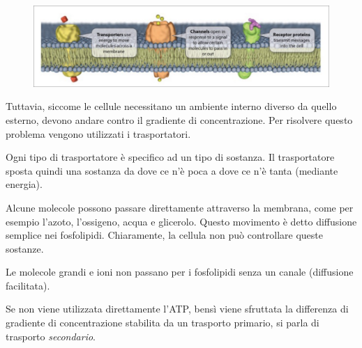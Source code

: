 \documentclass[a4paper]{article}
\begin{document}
\begin{figure}[h!]
    \centering
    \includegraphics[width=\textwidth]{./proteine_mem.png}
\end{figure}

Tuttavia, siccome le cellule necessitano un ambiente interno diverso da quello esterno,
devono andare contro il gradiente di concentrazione.
Per risolvere questo problema vengono utilizzati i trasportatori.

Ogni tipo di trasportatore è specifico ad un tipo di sostanza.
Il trasportatore sposta quindi una sostanza da dove ce n'è poca a dove ce n'è tanta (mediante energia).



Alcune molecole possono passare direttamente attraverso la membrana, come per esempio l'azoto, l'ossigeno, acqua e glicerolo.
Questo movimento è detto diffusione semplice nei fosfolipidi. Chiaramente, la cellula non può controllare queste sostanze.

Le molecole grandi e ioni non passano per i fosfolipidi senza un canale (diffusione facilitata).



Se non viene utilizzata direttamente l'ATP,
bensì viene sfruttata la differenza di gradiente di concentrazione stabilita da un trasporto primario,
si parla di trasporto \textit{secondario}.

\end{document}
